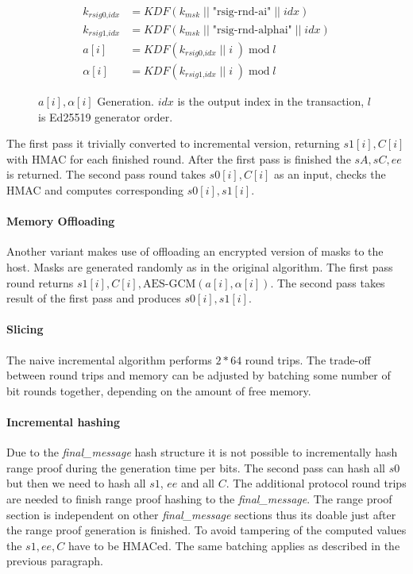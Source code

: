 \documentclass[]{article}
\begin{document}
\begin{figure}[H]

	\begin{equation}
	\begin{split}
	k_{\textit{rsig0,idx}} &= \textit{KDF}\left(k_{msk} \; || \; \text{"rsig-rnd-ai"} \; || \; idx \right)\\
	k_{\textit{rsig1,idx}} &= \textit{KDF}\left(k_{msk} \; || \; \text{"rsig-rnd-alphai"} \; || \; idx \right)\\
	a[i] &= \textit{KDF}(k_{\textit{rsig0,idx}} \; || \; i \; ) \; \text{mod} \; l  \\
	\alpha[i] &= \textit{KDF}(k_{\textit{rsig1,idx}} \; || \; i \; ) \; \text{mod} \; l
	\end{split}
	\end{equation}

	\caption{$a[i], \alpha[i]$ Generation. $idx$ is the output index in the transaction, $l$ is Ed25519 generator order.} \label{eq:masks}
\end{figure}

The first pass it trivially converted to incremental version, returning $s1[i], C[i]$ with HMAC for each finished round. 
After the first pass is finished the $sA, sC, ee$ is returned. The second pass round takes $s0[i], C[i]$ as an input, checks the HMAC and computes corresponding $s0[i], s1[i]$.

\paragraph{Memory Offloading}
Another variant makes use of offloading an encrypted version of masks to the host.
Masks are generated randomly as in the original algorithm.
The first pass round returns $s1[i], C[i], \text{AES-GCM}(a[i], \alpha[i])$.
The second pass takes result of the first pass and produces $s0[i], s1[i]$.

\paragraph{Slicing} 
The naive incremental algorithm performs $2 * 64$ round trips. The trade-off between round trips and memory can be adjusted by batching some number of bit rounds together, depending on the amount of free memory. 

\paragraph{Incremental hashing}
Due to the \emph{final\_message} hash structure it is not possible to incrementally hash range proof during the generation time per bits. The second pass can hash all $s0$ but then we need to hash all $s1$, $ee$ and all $C$. The additional protocol round trips are needed to finish range proof hashing to the \emph{final\_message}. The range proof section is independent on other \emph{final\_message} sections thus its doable just after the range proof generation is finished. To avoid tampering of the computed values the $s1, ee, C$ have to be HMACed. The same batching applies as described in the previous paragraph. 
\end{document}
